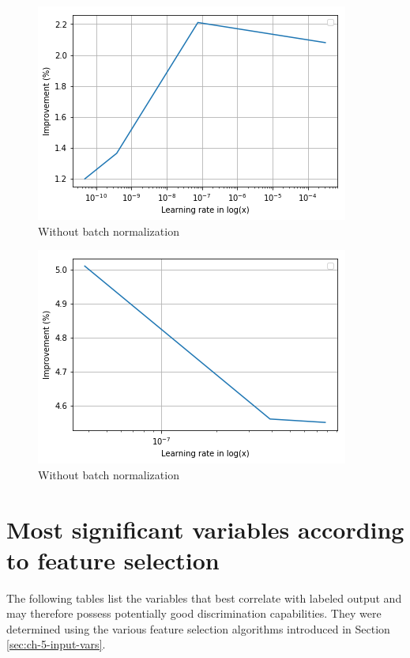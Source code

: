 \begin{figure}[h]
    \centering
    \includegraphics[width=.65\textwidth]{assets/appendix/plot_group1.png}
    \caption{Without batch normalization}
    \label{fig:ch_5_plot1}
\end{figure}
\begin{figure}[h]
    \centering
    \includegraphics[width=.65\textwidth]{assets/appendix/plot_group5.png}
    \caption{Without batch normalization}
    \label{fig:ch_5_plot5}
\end{figure}

\chapter{Most significant variables according to feature selection}
\label{ch:appendix_c}
The following tables list the variables that best correlate with labeled output and may therefore possess potentially good discrimination capabilities. They were determined using the various feature selection algorithms introduced in Section \ref{sec:ch-5-input-vars}.


